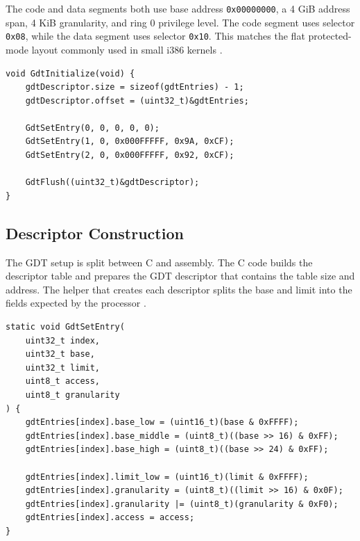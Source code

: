 The code and data segments both use base address \texttt{0x00000000}, a 4 GiB address span, 4 KiB granularity, and ring 0 privilege level. The code segment uses selector \texttt{0x08}, while the data segment uses selector \texttt{0x10}. This matches the flat protected-mode layout commonly used in small i386 kernels \cite{osdevGdtTutorial,intelSdm}.

\begin{listing}[H]
\begin{verbatim}
void GdtInitialize(void) {
    gdtDescriptor.size = sizeof(gdtEntries) - 1;
    gdtDescriptor.offset = (uint32_t)&gdtEntries;

    GdtSetEntry(0, 0, 0, 0, 0);
    GdtSetEntry(1, 0, 0x000FFFFF, 0x9A, 0xCF);
    GdtSetEntry(2, 0, 0x000FFFFF, 0x92, 0xCF);

    GdtFlush((uint32_t)&gdtDescriptor);
}
\end{verbatim}
\caption{Minimal GDT initialization with null, kernel code, and kernel data descriptors.}
\end{listing}

\subsection{Descriptor Construction}
The GDT setup is split between C and assembly. The C code builds the descriptor table and prepares the GDT descriptor that contains the table size and address. The helper that creates each descriptor splits the base and limit into the fields expected by the processor \cite{osdevGdtTutorial,intelSdm}.

\begin{listing}[H]
\begin{verbatim}
static void GdtSetEntry(
    uint32_t index,
    uint32_t base,
    uint32_t limit,
    uint8_t access,
    uint8_t granularity
) {
    gdtEntries[index].base_low = (uint16_t)(base & 0xFFFF);
    gdtEntries[index].base_middle = (uint8_t)((base >> 16) & 0xFF);
    gdtEntries[index].base_high = (uint8_t)((base >> 24) & 0xFF);

    gdtEntries[index].limit_low = (uint16_t)(limit & 0xFFFF);
    gdtEntries[index].granularity = (uint8_t)((limit >> 16) & 0x0F);
    gdtEntries[index].granularity |= (uint8_t)(granularity & 0xF0);
    gdtEntries[index].access = access;
}
\end{verbatim}
\caption{Building an x86 GDT descriptor from base, limit, access, and granularity fields.}
\end{listing}
\clearpage

